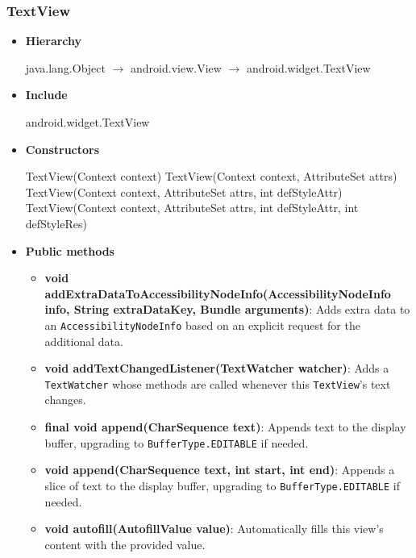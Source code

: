 \documentclass{report}
\begin{document}
    \pagebreak 
    \subsubsection{TextView}
    \begin{itemize}
        \item \textbf{Hierarchy} 
            \begin{center}
                java.lang.Object $\to$	android.view.View $\to$	android.widget.TextView
            \end{center}
        \item \textbf{Include}
            \bigbreak \noindent 
            \begin{javacode}
                android.widget.TextView
            \end{javacode}
        \item \textbf{Constructors}
            \bigbreak \noindent 
            \begin{javacode}
                TextView(Context context)
                TextView(Context context, AttributeSet attrs)
                TextView(Context context, AttributeSet attrs, int defStyleAttr)
                TextView(Context context, AttributeSet attrs, int defStyleAttr, int defStyleRes) 
            \end{javacode}
        \item \textbf{Public methods}
            \begin{itemize}
                \item \textbf{void addExtraDataToAccessibilityNodeInfo(AccessibilityNodeInfo info, String extraDataKey, Bundle arguments)}: Adds extra data to an \texttt{AccessibilityNodeInfo} based on an explicit request for the additional data.
                \item \textbf{void addTextChangedListener(TextWatcher watcher)}: Adds a \texttt{TextWatcher} whose methods are called whenever this \texttt{TextView}'s text changes.
                \item \textbf{final void append(CharSequence text)}: Appends text to the display buffer, upgrading to \texttt{BufferType.EDITABLE} if needed.
                \item \textbf{void append(CharSequence text, int start, int end)}: Appends a slice of text to the display buffer, upgrading to \texttt{BufferType.EDITABLE} if needed.
                \item \textbf{void autofill(AutofillValue value)}: Automatically fills this view’s content with the provided value.

\end{itemize}
\end{itemize}
\end{document}
